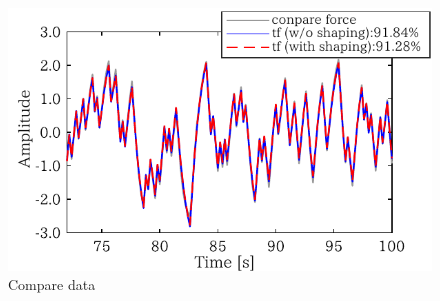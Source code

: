 \begin{figure}[t]
    \centering
        \includegraphics[keepaspectratio, scale=1.0]{contents/SystemIdentification/figure/1018Mseq_compare.pdf}
        \caption{Compare data}
        \label{fig:1018Mseq_compare}
\end{figure}

\clearpage
